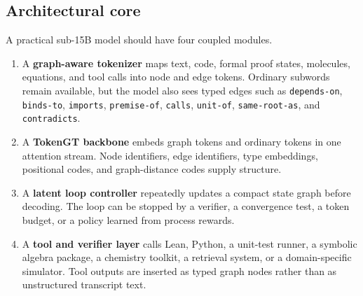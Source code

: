 \documentclass[11pt]{article}
\newcommand{\1}{\mathbf{1}}
\begin{document}
\subsection{Architectural core}

A practical sub-15B model should have four coupled modules.

\begin{enumerate}
\item A \textbf{graph-aware tokenizer} maps text, code, formal proof states, molecules, equations, and tool calls into node and edge tokens. Ordinary subwords remain available, but the model also sees typed edges such as \texttt{depends-on}, \texttt{binds-to}, \texttt{imports}, \texttt{premise-of}, \texttt{calls}, \texttt{unit-of}, \texttt{same-root-as}, and \texttt{contradicts}.
\item A \textbf{TokenGT backbone} embeds graph tokens and ordinary tokens in one attention stream. Node identifiers, edge identifiers, type embeddings, positional codes, and graph-distance codes supply structure.
\item A \textbf{latent loop controller} repeatedly updates a compact state graph before decoding. The loop can be stopped by a verifier, a convergence test, a token budget, or a policy learned from process rewards.
\item A \textbf{tool and verifier layer} calls Lean, Python, a unit-test runner, a symbolic algebra package, a chemistry toolkit, a retrieval system, or a domain-specific simulator. Tool outputs are inserted as typed graph nodes rather than as unstructured transcript text.
\end{enumerate}
\end{document}
